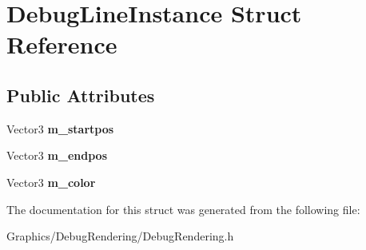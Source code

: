 \hypertarget{structDebugLineInstance}{}\section{Debug\+Line\+Instance Struct Reference}
\label{structDebugLineInstance}
\subsection*{Public Attributes}
\begin{DoxyCompactItemize}
\item 
\mbox{\label{structDebugLineInstance_aa1732db51793115864aa41688840c358}} 
Vector3 {\bfseries m\+\_\+startpos}
\item 
\mbox{\label{structDebugLineInstance_a41c27823edb10afec6f616a57adcf562}} 
Vector3 {\bfseries m\+\_\+endpos}
\item 
\mbox{\label{structDebugLineInstance_ad361db9b353f1faf16b0b5a197431535}} 
Vector3 {\bfseries m\+\_\+color}
\end{DoxyCompactItemize}


The documentation for this struct was generated from the following file\+:\begin{DoxyCompactItemize}
\item 
Graphics/\+Debug\+Rendering/Debug\+Rendering.\+h\end{DoxyCompactItemize}
